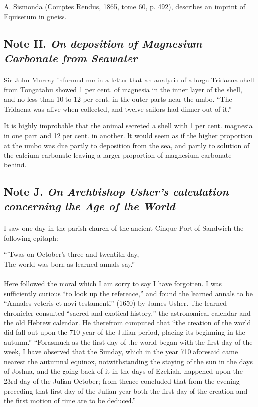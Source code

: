 \documentclass[a4paper, 12pt, oneside]{article}
\begin{document}
A. Sismonda (Comptes Rendus, 1865, tome 60, p. 492), describes an imprint of Equisetum in gneiss.

\subsection{Note H. \emph{On deposition of Magnesium Carbonate from Seawater}}
\paragraph{}
Sir John Murray informed me in a letter that an analysis of a large Tridacna shell from Tongatabu showed 1 per cent. of magnesia in the inner layer of the shell, and no less than 10 to 12 per cent. in the outer parts near the umbo. ``The Tridacna was alive when collected, and twelve sailors had dinner out of it.''

It is highly improbable that the animal secreted a shell with 1 per cent. magnesia in one part and 12 per cent. in another. It would seem as if the higher proportion at the umbo was due partly to deposition from the sea, and partly to solution of the calcium carbonate leaving a larger proportion of magnesium carbonate behind.

\subsection{Note J. \emph{On Archbishop Usher's calculation concerning the Age of the World}}
\paragraph{}
I saw one day in the parish church of the ancient Cinque Port of Sandwich the following epitaph:--
\begin{displayquote}
``'Twas on October's three and twentith day,\\The world was born as learned annals say.''
\end{displayquote}
\paragraph{}
Here followed the moral which I am sorry to say I have forgotten. I was sufficiently curious ``to look up the reference,'' and found the learned annals to be ``Annales veteris et novi testamenti'' (1650) by James Usher. The learned chronicler consulted ``sacred and exotical history,'' the astronomical calendar and the old Hebrew calendar. He therefrom computed that ``the creation of the world did fall out upon the 710 year of the Julian period, placing its beginning in the autumn.'' ``Forasmuch as the first day of the world began with the first day of the week, I have observed that the Sunday, which in the year 710 aforesaid came nearest the autumnal equinox, notwithstanding the staying of the sun in the days of Joshua, and the going back of it in the days of Ezekiah, happened upon the 23rd day of the Julian October; from thence concluded that from the evening preceding that first day of the Julian year both the first day of the creation and the first motion of time are to be deduced.''
\end{document}
